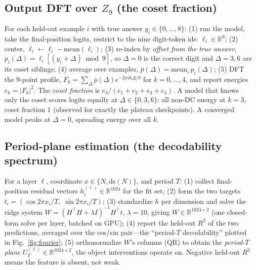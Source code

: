 \documentclass{article} %
\begin{document}
\subsection{Output DFT over $Z_9$ (the coset fraction)}
For each held-out example $i$ with true answer $y_i \in \{0,\dots,8\}$: (1) run the model, take the final-position logits, restrict to the nine digit-token ids: $\ell_i \in \mathbb{R}^9$; (2) center, $\ell_i \leftarrow \ell_i - \mathrm{mean}(\ell_i)$; (3) re-index by \emph{offset from the true answer}, $p_i(\Delta) = \ell_i[(y_i + \Delta) \bmod 9]$, so $\Delta = 0$ is the correct digit and $\Delta = 3, 6$ are its coset siblings; (4) average over examples, $\bar{p}(\Delta) = \mathrm{mean}_i\, p_i(\Delta)$; (5) DFT the 9-point profile, $F_k = \sum_\Delta \bar{p}(\Delta) e^{-2\pi i k \Delta / 9}$ for $k = 0,\dots,4$, and report energies $e_k = |F_k|^2$. The \emph{coset fraction} is $e_3 / (e_1{+}e_2{+}e_3{+}e_4)$. A model that knows only the coset scores logits equally at $\Delta \in \{0,3,6\}$: all non-DC energy at $k=3$, coset fraction $1$ (observed for exactly the plateau checkpoints). A converged model peaks at $\Delta = 0$, spreading energy over all $k$.

\subsection{Period-plane estimation (the decodability spectrum)}
For a layer $\ell$, coordinate $x \in \{N, \mathrm{ds}(N)\}$, and period $T$: (1) collect final-position residual vectors $h_i^{(\ell)} \in \mathbb{R}^{1024}$ for the fit set; (2) form the two targets $t_i = (\cos 2\pi x_i / T,\; \sin 2\pi x_i / T)$; (3) standardize $h$ per dimension and solve the ridge system $W = (H^\top H + \lambda I)^{-1} H^\top t$, $\lambda = 10$, giving $W \in \mathbb{R}^{1024 \times 2}$ (one closed-form solve per layer, batched on GPU); (4) report the held-out $R^2$ of the two predictions, averaged over the cos/sin pair---the ``period-$T$ decodability'' plotted in Fig.~\ref{fig:fourier}; (5) orthonormalize $W$'s columns (QR) to obtain the \emph{period-$T$ plane} $U_T^{(\ell)} \in \mathbb{R}^{1024 \times 2}$, the object interventions operate on. Negative held-out $R^2$ means the feature is absent, not weak.
\end{document}
